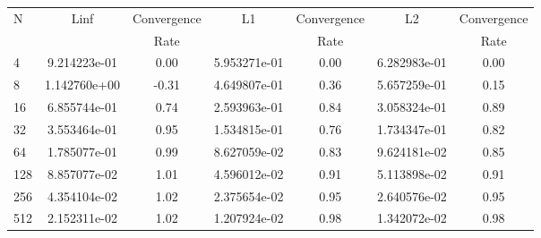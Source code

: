 \documentclass[12pt]{article}
\begin{document}
	\begin{tabular}{l|c|c|c|c|c|c}
		N&Linf&Convergence&L1&Convergence&L2&Convergence\\
		&&Rate&&Rate&&Rate\\
		\hline
		4&9.214223e-01&0.00&5.953271e-01&0.00&6.282983e-01&0.00\\
		\hline
		8&1.142760e+00&-0.31&4.649807e-01&0.36&5.657259e-01&0.15\\
		\hline
		16&6.855744e-01&0.74&2.593963e-01&0.84&3.058324e-01&0.89\\
		\hline
		32&3.553464e-01&0.95&1.534815e-01&0.76&1.734347e-01&0.82\\
		\hline
		64&1.785077e-01&0.99&8.627059e-02&0.83&9.624181e-02&0.85\\
		\hline
		128&8.857077e-02&1.01&4.596012e-02&0.91&5.113898e-02&0.91\\
		\hline
		256&4.354104e-02&1.02&2.375654e-02&0.95&2.640576e-02&0.95\\
		\hline
		512&2.152311e-02&1.02&1.207924e-02&0.98&1.342072e-02&0.98\\
	\end{tabular}
\end{document}
